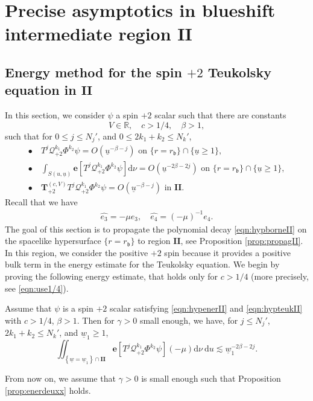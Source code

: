 \documentclass[reqno]{amsart}
\numberwithin{equation}{section}
\newcommand{\intS}{\int_{S(u,\ubar)}}
\newcommand{\mcq}{\mathcal{Q}}
\newcommand{\wbar}{\underline{w}}
\newcommand{\ubar}{{\underline{u}}}
\newcommand{\dee}{\mathrm{d}}
\newcommand{\ener}{\mathbf{e}}
\newcommand{\teuk}{\mathbf{T}}
\newcommand{\deux}{\mathbf{II}}
\newcommand{\rb}{r_\mathfrak{b}}
\theoremstyle{plain}
\theoremstyle{definition}
\theoremstyle{remark}
\numberwithin{equation}{section}
\begin{document}
\section{Precise asymptotics in blueshift intermediate region $\mathbf{II}$}
\label{section:blueshiftII}
\subsection{Energy method for the spin $+2$ Teukolsky equation in $\deux$}\label{subsection:energyII}
In this section, we consider $\psi$ a spin $+2$ scalar such that there are constants
$$V\in\mathbb{R},\quad c>1/4,\quad\beta>1,$$
such that for $0\leq j\leq N_j'$, and $0\leq 2k_1+k_2\leq N_k'$,
\begin{align}
    \bullet\:&T^j\mcq_{+2}^{k_1}\Phi^{k_2}\psi=O(\ubar^{-\beta-j})\text{   on   }\{r=r_\mathfrak{b}\}\cap\{\ubar\geq 1\}
    ,\label{eqn:hypborneII}\\
    \bullet\:&\intS\ener[T^j\mcq_{+2}^{k_1}\Phi^{k_2}\psi]\dee\nu=O(\ubar^{-2\beta-2j})\text{   on   }\{r=r_\mathfrak{b}\}\cap\{\ubar\geq 1\},\label{eqn:hypenerII}\\
    \bullet\:&\teuk_{+2}^{(c,V)}T^j\mcq_{+2}^{k_1}\Phi^{k_2}\psi=O(\ubar^{-\beta-j})\text{   in   }\deux.\label{eqn:hypteukII}
\end{align}
Recall that we have
\begin{align}
    \widehat{e_3}=-\mu e_3,\quad \widehat{e_4}=(-\mu)^{-1}e_4.
\end{align}
The goal of this section is to propagate the polynomial decay \eqref{eqn:hypborneII} on the spacelike hypersurface $\{r=\rb\}$ to region $\deux$, see Proposition \ref{prop:propagII}. In this region, we consider the positive $+2$ spin because it provides a positive bulk term in the energy estimate for the Teukolsky equation. We begin by proving the following energy estimate, that holds only for $c>1/4$ (more precisely, see \eqref{eqn:use1/4}).
\begin{prop}\label{prop:enerdeuxx}
    Assume that $\psi$ is a spin $+2$ scalar satisfying \eqref{eqn:hypenerII} and \eqref{eqn:hypteukII} with $c>1/4$, $\beta>1$. Then for $\gamma>0$ small enough, we have, for $j\leq N_j'$, $2k_1+k_2\leq N_k'$, and $\wbar_1\geq 1$,
    $$\iint_{\left\{\wbar={\wbar}_1\right\} \cap \mathbf{II}} \ener[T^j\mcq_{+2}^{k_1}\Phi^{k_2}\psi](-\mu) \dee\nu \mathrm{~d} u\lesssim \wbar_1^{-2\beta-2j}.$$
\end{prop}
\begin{rem}
    From now on, we assume that $\gamma>0$ is small enough such that Proposition \ref{prop:enerdeuxx} holds.
\end{rem}
\end{document}
